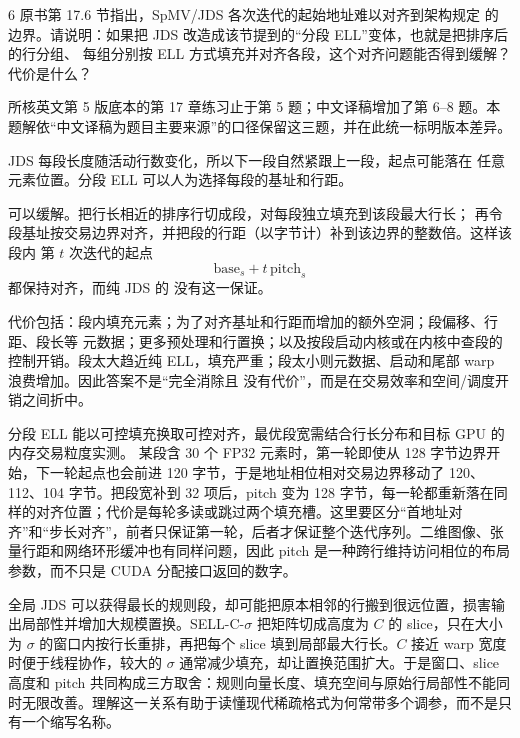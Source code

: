 \begin{solutionexercise}{6}
\problemheading 原书第 17.6 节指出，SpMV/JDS 各次迭代的起始地址难以对齐到架构规定
的边界。请说明：如果把 JDS 改造成该节提到的“分段 ELL”变体，也就是把排序后的行分组、
每组分别按 ELL 方式填充并对齐各段，这个对齐问题能否得到缓解？代价是什么？

\editorialnote 所核英文第 5 版底本的第 17 章练习止于第 5 题；中文译稿增加了第 6--8
题。本题解依“中文译稿为题目主要来源”的口径保留这三题，并在此统一标明版本差异。

\approachheading JDS 每段长度随活动行数变化，所以下一段自然紧跟上一段，起点可能落在
任意元素位置。分段 ELL 可以人为选择每段的基址和行距。

\answerheading 可以缓解。把行长相近的排序行切成段，对每段独立填充到该段最大行长；
再令段基址按交易边界对齐，并把段的行距（以字节计）补到该边界的整数倍。这样该段内
第 $t$ 次迭代的起点
\[
  \text{base}_{s}+t\,\text{pitch}_{s}
\]
都保持对齐，而纯 JDS 的  没有这一保证。

代价包括：段内填充元素；为了对齐基址和行距而增加的额外空洞；段偏移、行距、段长等
元数据；更多预处理和行置换；以及按段启动内核或在内核中查段的控制开销。段太大趋近纯
ELL，填充严重；段太小则元数据、启动和尾部 warp 浪费增加。因此答案不是“完全消除且
没有代价”，而是在交易效率和空间/调度开销之间折中。

\conclusionheading 分段 ELL 能以可控填充换取可控对齐，最优段宽需结合行长分布和目标
GPU 的内存交易粒度实测。
\discussionheading
{}
某段含 30 个 FP32 元素时，第一轮即使从 128 字节边界开始，下一轮起点也会前进 120 字节，于是地址相位相对交易边界移动了 120、112、104 字节。把段宽补到 32 项后，pitch 变为 128 字节，每一轮都重新落在同样的对齐位置；代价是每轮多读或跳过两个填充槽。这里要区分“首地址对齐”和“步长对齐”，前者只保证第一轮，后者才保证整个迭代序列。二维图像、张量行距和网络环形缓冲也有同样问题，因此 pitch 是一种跨行维持访问相位的布局参数，而不只是 CUDA 分配接口返回的数字。

全局 JDS 可以获得最长的规则段，却可能把原本相邻的行搬到很远位置，损害输出局部性并增加大规模置换。SELL-C-$\sigma$ 把矩阵切成高度为 $C$ 的 slice，只在大小为 $\sigma$ 的窗口内按行长重排，再把每个 slice 填到局部最大行长。$C$ 接近 warp 宽度时便于线程协作，较大的 $\sigma$ 通常减少填充，却让置换范围扩大。于是窗口、slice 高度和 pitch 共同构成三方取舍：规则向量长度、填充空间与原始行局部性不能同时无限改善。理解这一关系有助于读懂现代稀疏格式为何常带多个调参，而不是只有一个缩写名称。


\end{solutionexercise}
